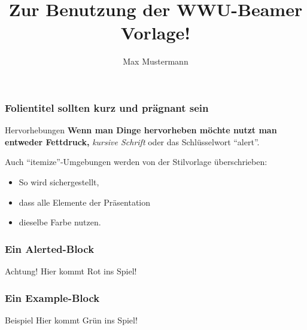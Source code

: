 \documentclass{beamer}
\author{Max Mustermann}
\title{Zur Benutzung der WWU-Beamer Vorlage!}
\begin{document}


\begin{frame}[plain]
  \maketitle
\end{frame}

\begin{frame}
  \frametitle{Folientitel sollten kurz und pr\"agnant sein}
  \begin{block}{Hervorhebungen}
    \textbf{Wenn man Dinge hervorheben m\"ochte nutzt man entweder Fettdruck,}
    \textit{ kursive Schrift} \alert{ oder das Schl\"usselwort ``alert''}.

  Auch ``itemize''-Umgebungen werden von der Stilvorlage überschrieben:
  \end{block}
  \pause
  \begin{itemize}
    \item So wird sichergestellt,
    \item dass alle Elemente der Präsentation 
    \item dieselbe Farbe nutzen.
  \end{itemize}
\end{frame}

\begin{frame}
  \frametitle{Ein Alerted-Block}
  \begin{alertblock}{Achtung!}
    Hier kommt Rot ins Spiel!
  \end{alertblock}
\end{frame}

\begin{frame}
  \frametitle{Ein Example-Block}
  \begin{exampleblock}{Beispiel}
    Hier kommt Grün ins Spiel!
  \end{exampleblock}
\end{frame}

\end{document}
